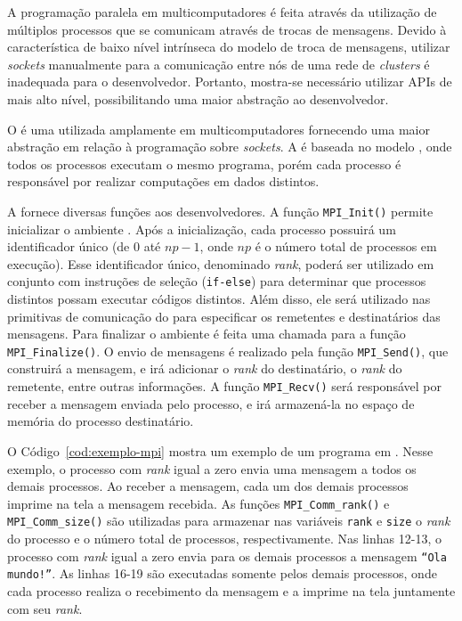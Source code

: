 A programação paralela em multicomputadores é feita através da utilização de múltiplos processos que se comunicam
através de trocas de mensagens. Devido à característica de baixo nível intrínseca do modelo de troca de
mensagens, utilizar \textit{sockets} manualmente para a comunicação entre nós de
uma rede de \textit{clusters} é inadequada para o desenvolvedor. Portanto, mostra-se necessário utilizar
APIs de mais alto nível, possibilitando uma maior abstração ao desenvolvedor.

O \mpi é uma \api utilizada amplamente em multicomputadores fornecendo uma maior
abstração em relação à programação sobre \textit{sockets}. A \api é baseada no
modelo \spmd, onde todos os processos executam o mesmo programa, porém cada processo é responsável
por realizar computações em dados distintos.

A \api fornece diversas funções aos desenvolvedores. A função \texttt{MPI\_Init()} permite inicializar o ambiente \mpi.
Após a inicialização, cada processo \mpi possuirá um identificador único (de $0$ até $np-1$, onde $np$ é o número total
de processos \mpi em execução). Esse identificador único, denominado \textit{rank}, poderá ser utilizado em conjunto com
instruções de seleção (\texttt{if-else}) para determinar que processos \mpi
distintos possam executar códigos distintos. Além disso,
ele será utilizado nas primitivas de comunicação do \mpi para especificar os remetentes e destinatários das mensagens.
Para finalizar o ambiente \mpi é feita uma chamada para a função \texttt{MPI\_Finalize()}. O envio de mensagens
é realizado pela função \texttt{MPI\_Send()}, que construirá a mensagem, e irá
adicionar o \textit{rank} do destinatário, o \textit{rank} do remetente, entre
outras informações. A função \texttt{MPI\_Recv()} será responsável por receber a
mensagem enviada pelo processo, e irá armazená-la no espaço de memória
do processo destinatário.

O Código~\ref{cod:exemplo-mpi} mostra um exemplo de um programa em \mpi. Nesse
exemplo, o processo com \textit{rank} igual a zero
envia uma mensagem a todos os demais processos. Ao receber a mensagem, cada um dos demais processos imprime na tela a mensagem
recebida. As funções \texttt{MPI\_Comm\_rank()} e \texttt{MPI\_Comm\_size()} são utilizadas para armazenar nas variáveis \texttt{rank} e \texttt{size}
o \textit{rank} do processo e o número total de processos, respectivamente. Nas
linhas 12-13, o processo com \textit{rank} igual a zero envia para os
demais processos a mensagem \texttt{``Ola mundo!''}. As linhas 16-19 são executadas somente pelos demais processos, onde cada processo
realiza o recebimento da mensagem e a imprime na tela juntamente com seu \textit{rank}.

